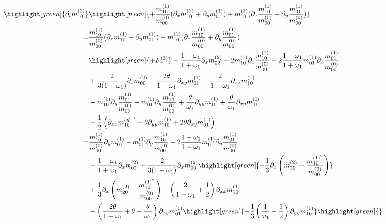 \documentclass{article}
\begin{document}
\begin{align*}
  \highlight[green]{
  \partial_t m_{10}^{(1)}}
  &
  \highlight[green]{+ \frac{m_{10}^{(1)}}{m_{00}^{(0)}} ( \partial_x m_{10}^{(1)} + \partial_y m_{01}^{(1)} )
  + m_{10}^{(1)} ( \partial_x \frac{m_{10}^{(1)}}{m_{00}^{(0)}} + \partial_y \frac{m_{01}^{(1)}}{m_{00}^{(0)}} )}
  \\=&
  \frac{m_{10}^{(1)}}{m_{00}^{(0)}} ( \partial_x m_{10}^{(1)} + \partial_y m_{01}^{(1)} )
  + m_{10}^{(1)} ( \partial_x \frac{m_{10}^{(1)}}{m_{00}^{(0)}} + \partial_y \frac{m_{01}^{(1)}}{m_{00}^{(0)}} )
  \\&
  \highlight[green]{
  + F_x^{(3)}
  }
  - \frac{1-\omega_1}{1+\omega_1} \partial_x m_{02}^{(2)}
  - 2 m_{10}^{(1)} \partial_x \frac{ m_{10}^{(1)} }{m_{00}^{(0)}}
  - 2 \frac{1-\omega_1}{1+\omega_1} m_{01}^{(1)}\partial_x\frac{m_{01}^{(1)}}{m_{00}^{(0)}}
  \\&
  + \frac{ 2}{3(1-\omega_1)} \partial_x m_{00}^{(2)}
  - \frac{2\theta}{1-\omega_1}\partial_{xy} m_{01}^{(1)}
  - \frac{2}{1-\omega_1}\partial_{xx} m_{10}^{(1)}
  \\&
  -m_{10}^{(1)}\partial_y \frac{ m_{01}^{(1)}}{m_{00}^{(0)}}
  -m_{01}^{(1)}\partial_y \frac{ m_{10}^{(1)}}{m_{00}^{(0)}}
  + \frac{\theta}{\omega_1}\partial_{yy} m_{10}^{(1)}
  + \frac{\theta}{\omega_1}\partial_{xy} m_{01}^{(1)}
  \\&
  - \frac{1}{2} \left(\partial_{xx} m_{10}^{eq^{(1)}} + \theta\partial_{yy} m_{10}^{(1)} + 2\theta\partial_{xy} m_{01}^{(1)}\right)
  \\=&
    \frac{m_{10}^{(1)}}{m_{00}^{(0)}} \partial_y m_{01}^{(1)}
  - m_{01}^{(1)} \partial_y \frac{m_{10}^{(1)}}{m_{00}^{(0)}}
  - 2 \frac{1 - \omega_1}{1 + \omega_1} m_{01}^{(1)} \partial_y \frac{m_{01}^{(1)}}{m_{00}^{(0)}}
  \\&
  - \frac{1 - \omega_1}{1 + \omega_1} \partial_x m_{02}^{(2)}
  + \frac{2}{3(1-\omega_1)} \partial_x m_{00}^{(2)}
  \highlight[green]{
  - \frac{1}{3} \partial_x \left(m_{20}^{(2)} - \frac{m_{10}^{{(1)}^2}}{m_{00}^{(0)}}\right)
  }
  \\&
  + \frac{1}{3} \partial_x \left(m_{20}^{(2)} - \frac{m_{10}^{{(1)}^2}}{m_{00}^{(0)}}\right)
  - \left( \frac{2}{1-\omega_1} + \frac{1}{2}\right) \partial_{xx} m_{10}^{(1)}
  \\&
  - \left( \frac{2\theta}{1-\omega_1} +\theta- \frac{\theta}{\omega_1}\right) \partial_{xy} m_{01}^{(1)}
  \highlight[green]{
  + \frac{1}{3}\left( \frac{1}{\omega_1} - \frac{1}{2}\right) \partial_{yy} m_{10}^{(1)}
  }
  \highlight[green]{
}
\end{align*}
\end{document}
